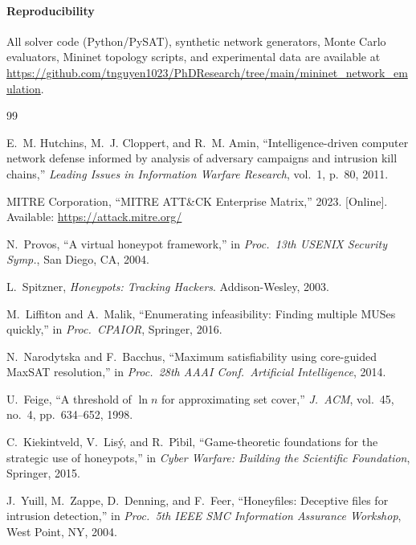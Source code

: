 \documentclass[journal]{IEEEtran}
\begin{document}
\paragraph{Reproducibility}
All solver code (Python/PySAT), synthetic network generators, Monte
Carlo evaluators, Mininet topology scripts, and experimental data
are available at\\
\url{https://github.com/tnguyen1023/PhDResearch/tree/main/mininet_network_emulation}.


\begin{thebibliography}{99}

E.~M. Hutchins, M.~J. Cloppert, and R.~M. Amin,
``Intelligence-driven computer network defense informed by analysis
of adversary campaigns and intrusion kill chains,''
\emph{Leading Issues in Information Warfare Research},
vol.~1, p.~80, 2011.

MITRE Corporation, ``MITRE ATT\&CK Enterprise Matrix,'' 2023.
[Online]. Available: \url{https://attack.mitre.org/}

N.~Provos, ``A virtual honeypot framework,''
in \emph{Proc.\ 13th USENIX Security Symp.},
San Diego, CA, 2004.

L.~Spitzner, \emph{Honeypots: Tracking Hackers}.
Addison-Wesley, 2003.

M.~Liffiton and A.~Malik,
``Enumerating infeasibility: Finding multiple MUSes quickly,''
in \emph{Proc.\ CPAIOR}, Springer, 2016.

N.~Narodytska and F.~Bacchus,
``Maximum satisfiability using core-guided MaxSAT resolution,''
in \emph{Proc.\ 28th AAAI Conf.\ Artificial Intelligence}, 2014.

U.~Feige, ``A threshold of $\ln n$ for approximating set cover,''
\emph{J.\ ACM}, vol.~45, no.~4, pp.~634--652, 1998.

C.~Kiekintveld, V.~Lis\'y, and R.~P\'{\i}bil,
``Game-theoretic foundations for the strategic use of honeypots,''
in \emph{Cyber Warfare: Building the Scientific Foundation},
Springer, 2015.

J.~Yuill, M.~Zappe, D.~Denning, and F.~Feer,
``Honeyfiles: Deceptive files for intrusion detection,''
in \emph{Proc.\ 5th IEEE SMC Information Assurance Workshop},
West Point, NY, 2004.


\end{thebibliography}
\end{document}
